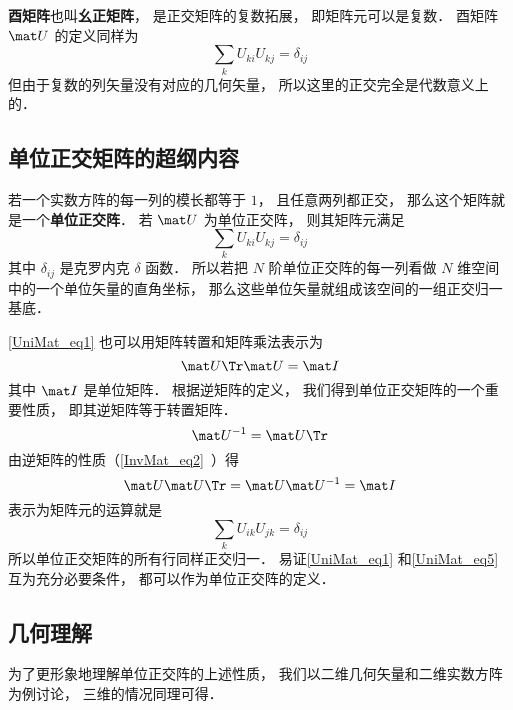 

\textbf{酉矩阵}也叫\textbf{幺正矩阵}， 是正交矩阵的复数拓展， 即矩阵元可以是复数． 酉矩阵 $\mat U$ 的定义同样为
\begin{equation}
\sum_k U_{ki} U_{kj} = \delta_{ij}
\end{equation}
但由于复数的列矢量没有对应的几何矢量， 所以这里的正交完全是代数意义上的．


\subsection{单位正交矩阵的超纲内容}


若一个实数方阵的每一列的模长都等于 $1$， 且任意两列都正交， 那么这个矩阵就是一个\textbf{单位正交阵}． 若 $\mat U$ 为单位正交阵， 则其矩阵元满足
\begin{equation}\label{UniMat_eq1}
\sum_k U_{ki} U_{kj} = \delta_{ij}
\end{equation}
其中 $\delta_{ij}$ 是克罗内克 $\delta$ 函数． 所以若把 $N$ 阶单位正交阵的每一列看做 $N$ 维空间中的一个单位矢量的直角坐标， 那么这些单位矢量就组成该空间的一组正交归一基底．

\autoref{UniMat_eq1} 也可以用矩阵转置和矩阵乘法表示为
\begin{equation}
\mat U\Tr \mat U = \mat I
\end{equation}
其中 $\mat I$ 是单位矩阵． 根据逆矩阵的定义， 我们得到单位正交矩阵的一个重要性质， 即其逆矩阵等于转置矩阵．
\begin{equation}
\mat U^{-1} = \mat U\Tr
\end{equation}
由逆矩阵的性质（\autoref{InvMat_eq2}~）得
\begin{equation}
\mat U \mat U\Tr = \mat U \mat U^{-1} = \mat I
\end{equation}
表示为矩阵元的运算就是
\begin{equation}\label{UniMat_eq5}
\sum_k U_{ik} U_{jk} = \delta_{ij}
\end{equation}
所以单位正交矩阵的所有行同样正交归一． 易证\autoref{UniMat_eq1} 和\autoref{UniMat_eq5} 互为充分必要条件， 都可以作为单位正交阵的定义．

\subsection{几何理解}
为了更形象地理解单位正交阵的上述性质， 我们以二维几何矢量和二维实数方阵为例讨论， 三维的情况同理可得．

